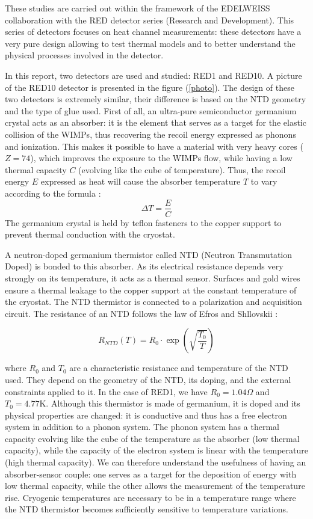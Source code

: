 These studies are carried out within the framework of the EDELWEISS collaboration with the RED detector series (Research and Development). This series of detectors focuses on heat channel measurements: these detectors have a very pure design allowing to test thermal models and to better understand the physical processes involved in the detector. 

In this report, two detectors are used and studied: RED1 and RED10. A picture of the RED10 detector is presented in the figure (\ref{photo}). The design of these two detectors is extremely similar, their difference is based on the NTD geometry and the type of glue used. First of all, an ultra-pure semiconductor germanium crystal acts as an absorber: it is the element that serves as a target for the elastic collision of the WIMPs, thus recovering the recoil energy expressed as phonons and ionization. This makes it possible to have a material with very heavy cores ($Z=74$), which improves the exposure to the WIMPs flow, while having a low thermal capacity $C$ (evolving like the cube of temperature). Thus, the recoil energy $E$ expressed as heat will cause the absorber temperature $T$ to vary according to the formula :
\begin{equation}
\Delta T = \frac{E}{C}
\label{capa}
\end{equation}
The germanium crystal is held by teflon fasteners to the copper support to prevent thermal conduction with the cryostat.

A neutron-doped germanium thermistor called NTD (Neutron Transmutation Doped) is bonded to this absorber. As its electrical resistance depends very strongly on its temperature, it acts as a thermal sensor.  Surfaces and gold wires ensure a thermal leakage to the copper support at the constant temperature of the cryostat. The NTD thermistor is connected to a polarization and acquisition circuit. The resistance of an NTD follows the law of Efros and Shllovskii \cite{mccammon}:

\begin{equation}
\label{eq:ntd-resistivity}
R_{NTD}(T) = R_0 \cdot \exp(\sqrt{\frac{T_0}{T}})
\end{equation}

where $R_0$ and $T_0$ are a characteristic resistance and temperature of the NTD used. They depend on the geometry of the NTD, its doping, and the external constraints applied to it. In the case of RED1, we have $R_0=1.04 \Omega$ and $T_0=4.77 \textrm{K}$. Although this thermistor is made of germanium, it is doped and its physical properties are changed: it is conductive and thus has a free electron system in addition to a phonon system. The phonon system has a thermal capacity evolving like the cube of the temperature as the absorber (low thermal capacity), while the capacity of the electron system is linear with the temperature (high thermal capacity). We can therefore understand the usefulness of having an absorber-sensor couple: one serves as a target for the deposition of energy with low thermal capacity, while the other allows the measurement of the temperature rise. Cryogenic temperatures are necessary to be in a temperature range where the NTD thermistor becomes sufficiently sensitive to temperature variations.

